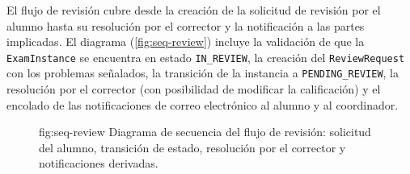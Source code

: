 El flujo de revisión cubre desde la creación de la solicitud de
revisión por el alumno hasta su resolución por el corrector y la
notificación a las partes implicadas. El diagrama
(\cref{fig:seq-review}) incluye la validación de que la
\texttt{ExamInstance} se encuentra en estado \texttt{IN\_REVIEW}, la
creación del \texttt{ReviewRequest} con los problemas señalados, la
transición de la instancia a \texttt{PENDING\_REVIEW}, la resolución
por el corrector (con posibilidad de modificar la calificación) y el
encolado de las notificaciones de correo electrónico al alumno y al
coordinador.

\begin{figure}[Flujo de solicitud y resolución de revisión]%
              {fig:seq-review}%
              {Diagrama de secuencia del flujo de revisión: solicitud
               del alumno, transición de estado, resolución por el
               corrector y notificaciones derivadas.}
\end{figure}
